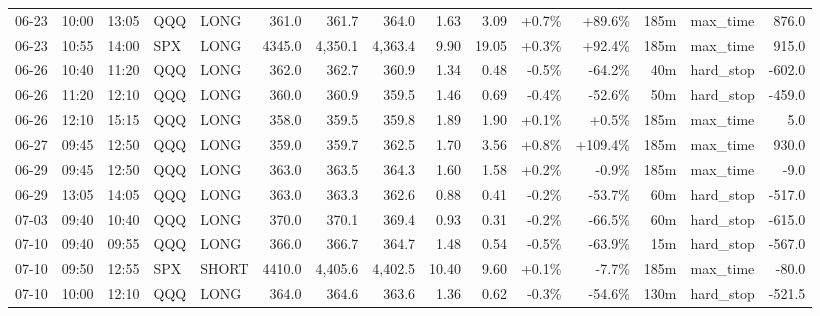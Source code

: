 \documentclass[11pt,a4paper,twoside]{article}
\begin{document}
\begin{landscape}
\begin{center}
\begin{longtable}{>{\color{txtmain}}l l l l l r r r r r r r r >{\color{txtmain}}l r}
06-23 & 10:00 & 13:05 & QQQ & LONG & 361.0 & 361.7 & 364.0 & 1.63 & 3.09 & \textcolor{wingreen}{+0.7\%} & \textcolor{wingreen}{+89.6\%} & 185m & max\_time & \textcolor{wingreen}{876.0} \\
06-23 & 10:55 & 14:00 & SPX & LONG & 4345.0 & 4,350.1 & 4,363.4 & 9.90 & 19.05 & \textcolor{wingreen}{+0.3\%} & \textcolor{wingreen}{+92.4\%} & 185m & max\_time & \textcolor{wingreen}{915.0} \\
06-26 & 10:40 & 11:20 & QQQ & LONG & 362.0 & 362.7 & 360.9 & 1.34 & 0.48 & \textcolor{lossred}{-0.5\%} & \textcolor{lossred}{-64.2\%} & 40m & hard\_stop & \textcolor{lossred}{-602.0} \\
06-26 & 11:20 & 12:10 & QQQ & LONG & 360.0 & 360.9 & 359.5 & 1.46 & 0.69 & \textcolor{lossred}{-0.4\%} & \textcolor{lossred}{-52.6\%} & 50m & hard\_stop & \textcolor{lossred}{-459.0} \\
06-26 & 12:10 & 15:15 & QQQ & LONG & 358.0 & 359.5 & 359.8 & 1.89 & 1.90 & \textcolor{wingreen}{+0.1\%} & \textcolor{wingreen}{+0.5\%} & 185m & max\_time & \textcolor{wingreen}{5.0} \\
06-27 & 09:45 & 12:50 & QQQ & LONG & 359.0 & 359.7 & 362.5 & 1.70 & 3.56 & \textcolor{wingreen}{+0.8\%} & \textcolor{wingreen}{+109.4\%} & 185m & max\_time & \textcolor{wingreen}{930.0} \\
06-29 & 09:45 & 12:50 & QQQ & LONG & 363.0 & 363.5 & 364.3 & 1.60 & 1.58 & \textcolor{wingreen}{+0.2\%} & \textcolor{lossred}{-0.9\%} & 185m & max\_time & \textcolor{lossred}{-9.0} \\
06-29 & 13:05 & 14:05 & QQQ & LONG & 363.0 & 363.3 & 362.6 & 0.88 & 0.41 & \textcolor{lossred}{-0.2\%} & \textcolor{lossred}{-53.7\%} & 60m & hard\_stop & \textcolor{lossred}{-517.0} \\
07-03 & 09:40 & 10:40 & QQQ & LONG & 370.0 & 370.1 & 369.4 & 0.93 & 0.31 & \textcolor{lossred}{-0.2\%} & \textcolor{lossred}{-66.5\%} & 60m & hard\_stop & \textcolor{lossred}{-615.0} \\
07-10 & 09:40 & 09:55 & QQQ & LONG & 366.0 & 366.7 & 364.7 & 1.48 & 0.54 & \textcolor{lossred}{-0.5\%} & \textcolor{lossred}{-63.9\%} & 15m & hard\_stop & \textcolor{lossred}{-567.0} \\
07-10 & 09:50 & 12:55 & SPX & SHORT & 4410.0 & 4,405.6 & 4,402.5 & 10.40 & 9.60 & \textcolor{wingreen}{+0.1\%} & \textcolor{lossred}{-7.7\%} & 185m & max\_time & \textcolor{lossred}{-80.0} \\
07-10 & 10:00 & 12:10 & QQQ & LONG & 364.0 & 364.6 & 363.6 & 1.36 & 0.62 & \textcolor{lossred}{-0.3\%} & \textcolor{lossred}{-54.6\%} & 130m & hard\_stop & \textcolor{lossred}{-521.5} \\

\end{longtable}
\end{center}
\end{landscape}
\end{document}
